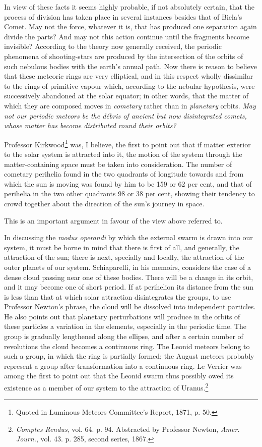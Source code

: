 \documentclass[a4paper, 12pt, oneside, polutonikogreek, english]{article}
\begin{document}
In view of these facts it seems highly probable, if not absolutely certain, that the process of division has taken place in several instances besides that of Biela's Comet. May not the force, whatever it is, that has produced one separation again divide the parts? And may not this action continue until the fragments become invisible? According to the theory now generally received, the periodic phenomena of shooting-stars are produced by the intersection of the orbits of such nebulous bodies with the earth's annual path. Now there is reason to believe that these meteoric rings are very elliptical, and in this respect wholly dissimilar to the rings of primitive vapour which, according to the nebular hypothesis, were successively abandoned at the solar equator; in other words, that the matter of which they are composed moves in \emph{cometary} rather than in \emph{planetary} orbits. \emph{May not our periodic meteors be the débris of ancient but now disintegrated comets, whose matter has become distributed round their orbits?}

Professor Kirkwood\footnote{Quoted in Luminous Meteors Committee's Report, 1871, p. 50.} was, I believe, the first to point out that if matter exterior to the solar system is attracted into it, the motion of the system through the matter-containing space must be taken into consideration. The number of cometary perihelia found in the two quadrants of longitude towards and from which the sun is moving was found by him to be 159 or 62 per cent, and that of perihelia in the two other quadrants 98 or 38 per cent, showing their tendency to crowd together about the direction of the sun's journey in space.

This is an important argument in favour of the view above referred to.

In discussing the \emph{modus operandi} by which the external swarm is drawn into our system, it must be borne in mind that there is first of all, and generally, the attraction of the sun; there is next, specially and locally, the attraction of the outer planets of our system. Schiaparelli, in his memoirs, considers the case of a dense cloud passing near one of these bodies. There will be a change in its orbit, and it may become one of short period. If at perihelion its distance from the sun is less than that at which solar attraction disintegrates the groups, to use Professor Newton's phrase, the cloud will be dissolved into independent particles. He also points out that planetary perturbations will produce in the orbits of these particles a variation in the elements, especially in the periodic time. The group is gradually lengthened along the ellipse, and after a certain number of revolutions the cloud becomes a continuous ring. The Leonid meteors belong to such a group, in which the ring is partially formed; the August meteors probably represent a group after transformation into a continuous ring. Le Verrier was among the first to point out that the Leonid swarm thus possibly owed its existence as a member of our system to the attraction of Uranus.\footnote{\emph{Comptes Rendus}, vol. 64. p. 94. Abstracted by Professor Newton, \emph{Amer. Journ.}, vol. 43. p. 285, second series, 1867.}
\end{document}
